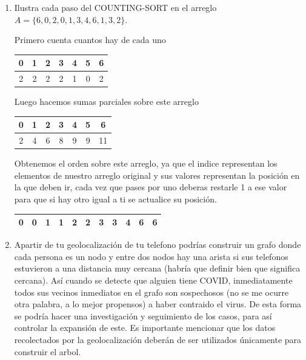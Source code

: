 \documentclass[letterpaper]{article}
\theoremstyle{definition}
\theoremstyle{lemathm}
\theoremstyle{lemademthm}
\begin{document}
\begin{enumerate}
		\item Ilustra cada paso del COUNTING-SORT en el arreglo $A = \{6,0,2,0,1,3,4,6,1,3,2\}$.
		
		Primero cuenta cuantos hay de cada uno
		
		\begin{tabular}{|c|c|c|c|c|c|c|}
			\hline
			0 & 1 & 2 & 3 & 4 & 5 & 6\\
			\hline
			2 & 2 & 2 & 2 & 1 & 0 & 2\\
			\hline
		\end{tabular}

		Luego hacemos sumas parciales sobre este arreglo

		\begin{tabular}{|c|c|c|c|c|c|c|}
			\hline
			0 & 1 & 2 & 3 & 4 & 5 & 6\\
			\hline
			2 & 4 & 6 & 8 & 9 & 9 & 11\\
			\hline
		\end{tabular}

		Obtenemos el orden sobre este arreglo, ya que el indice representan los elementos de nuestro arreglo original y sus valores representan la posición en la que deben ir, cada vez que pases por uno deberas restarle 1 a ese valor para que si hay otro igual a ti se actualice su posición.

		\begin{tabular}{|c|c|c|c|c|c|c|c|c|c|c|}
			\hline
			0 & 0 & 1 & 1 & 2 & 2 & 3 & 3 & 4 & 6 & 6\\
			\hline
		\end{tabular}

		\item Apartir de tu geolocalización de tu telefono podrías construir un grafo donde cada persona es un nodo y entre dos nodos hay una arista si sus telefonos estuvieron a una distancia muy cercana (habría que definir bien que significa cercana). Así cuando se detecte que alguien tiene COVID, inmediatamente todos sus vecinos inmediatos en el grafo son sospechosos (no se me ocurre otra palabra, a lo mejor propensos) a haber contraido el virus. De esta forma se podría hacer una investigación y seguimiento de los casos, para así controlar la expansión de este. Es importante mencionar que los datos recolectados por la geolocalización deberán de ser utilizados únicamente para construir el arbol.

	\end{enumerate}
	
\end{document}
